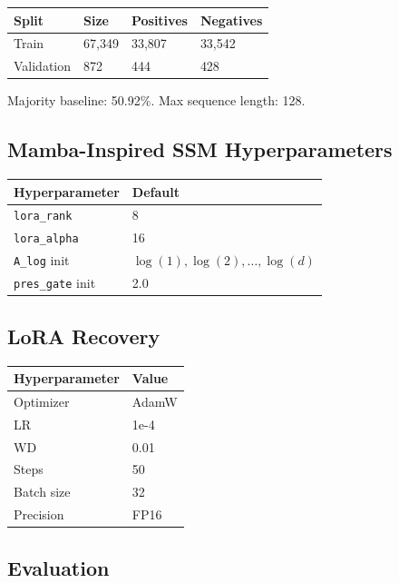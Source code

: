 \begin{table}[H]
\centering
\small
\begin{tabular}{llll}
\toprule
\textbf{Split} & \textbf{Size} & \textbf{Positives} & \textbf{Negatives} \\
\midrule
Train & 67,349 & 33,807 & 33,542 \\
Validation & 872 & 444 & 428 \\
\bottomrule
\end{tabular}
\end{table}

Majority baseline: 50.92\%. Max sequence length: 128.

\subsection{Mamba-Inspired SSM Hyperparameters}

\begin{table}[H]
\centering
\small
\begin{tabular}{ll}
\toprule
\textbf{Hyperparameter} & \textbf{Default} \\
\midrule
\texttt{lora\_rank} & 8 \\
\texttt{lora\_alpha} & 16 \\
\texttt{A\_log} init & $\log(1), \log(2), \ldots, \log(d)$ \\
\texttt{pres\_gate} init & 2.0 \\
\bottomrule
\end{tabular}
\end{table}

\subsection{LoRA Recovery}

\begin{table}[H]
\centering
\small
\begin{tabular}{ll}
\toprule
\textbf{Hyperparameter} & \textbf{Value} \\
\midrule
Optimizer & AdamW \\
LR & 1e-4 \\
WD & 0.01 \\
Steps & 50 \\
Batch size & 32 \\
Precision & FP16 \\
\bottomrule
\end{tabular}
\end{table}

\subsection{Evaluation}

